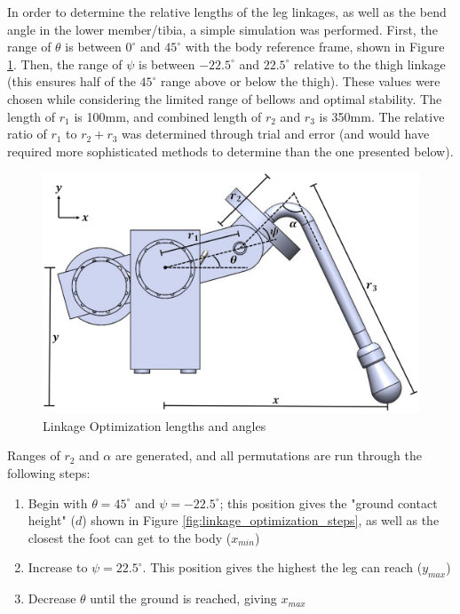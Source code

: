 In order to determine the relative lengths of the leg linkages, as well as the bend angle in the lower member/tibia, a simple simulation was performed.
First, the range of $\theta$ is between $0^{\circ}$ and $45^{\circ}$ with the body reference frame, shown in Figure \ref{fig:linkage_optimization_diagram}.
Then, the range of $\psi$ is between $-22.5^{\circ}$ and $22.5^{\circ}$ relative to the thigh linkage (this ensures half of the $45^{\circ}$ range above or below the thigh). These values were chosen while considering the limited range of bellows and optimal stability.
The length of $r_1$ is 100mm, and combined length of $r_2$ and $r_3$ is 350mm.
The relative ratio of $r_1$ to $r_2 + r_3$ was determined through trial and error (and would have required more sophisticated methods to determine than the one presented below).

\begin{figure}
    \centering
    \includegraphics[width=\textwidth]{3_SystemModelling/img/LinkageOptimizationDiagram.png}
    \caption{Linkage Optimization lengths and angles}
    \label{fig:linkage_optimization_diagram}
\end{figure}{}


Ranges of $r_2$ and $\alpha$ are generated, and all permutations are run through the following steps:

\begin{enumerate}
    \item Begin with $\theta = 45^{\circ}$ and $\psi = -22.5^{\circ}$; this position gives the "ground contact height" ($d$) shown in Figure \ref{fig:linkage_optimization_steps}, as well as the closest the foot can get to the body ($x_{min}$)
    \item Increase to $\psi = 22.5^{\circ}$. This position gives the highest the leg can reach ($y_{max}$)
    \item Decrease $\theta$ until the ground is reached, giving $x_{max}$
\end{enumerate}{}

